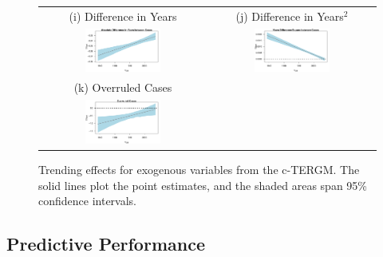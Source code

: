 \documentclass[headsepline=true, abstracton]{scrartcl}
\begin{document}
\begin{figure}[H]
\begin{tabular}{cc}
 (i) Difference in Years & (j) Difference in Years$^2$ \\
\includegraphics[width = 0.475\textwidth, trim= 0.1cm 1cm 0.5cm .45cm,clip=true]{images/yeardiff_coef_trend_linear.pdf} & \includegraphics[width = 0.475\textwidth, trim= 0.1cm 1cm 0.5cm .45cm,clip=true]{images/yeardiffsquare_coef_trend_linear.pdf} \\

 (k) Overruled Cases &  \\
\includegraphics[width = 0.475\textwidth, trim= 0.1cm 1cm 0.5cm .45cm,clip=true]{images/overruled_coef_trend_linear.pdf} &  \\

 \end{tabular}
\caption{Trending effects for exogenous variables from the c-TERGM. The solid lines plot the point estimates, and the shaded areas span 95\% confidence intervals. }
 \label{fig:coeftrends_exo}
\vspace{-.25cm}
\end{figure} 






\subsection{Predictive Performance}
\end{document}
